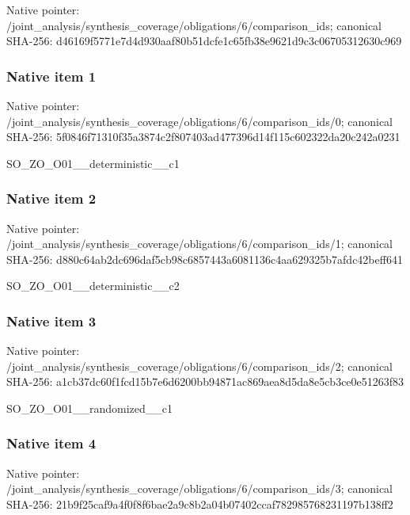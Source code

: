 \documentclass[10pt,a4paper]{article}
\begin{document}
Native pointer: /joint\_analysis/synthesi\allowbreak{}s\_coverage/obligations/6\allowbreak{}/comparison\_ids; canonical SHA-256: d46169f5771e7d4d930aaf80\allowbreak{}b51dcfe1c65fb38e9621d9c3\allowbreak{}c06705312630c969



\subsubsection{Native item 1}


Native pointer: /joint\_analysis/synthesi\allowbreak{}s\_coverage/obligations/6\allowbreak{}/comparison\_ids/0; canonical SHA-256: 5f0846f71310f35a3874c2f8\allowbreak{}07403ad477396d14f115c602\allowbreak{}322da20c242a0231


SO\_ZO\_O01\_\_deterministic\_\_c1


\subsubsection{Native item 2}


Native pointer: /joint\_analysis/synthesi\allowbreak{}s\_coverage/obligations/6\allowbreak{}/comparison\_ids/1; canonical SHA-256: d880c64ab2dc696daf5cb98c\allowbreak{}6857443a6081136c4aa62932\allowbreak{}5b7afdc42beff641


SO\_ZO\_O01\_\_deterministic\_\_c2


\subsubsection{Native item 3}


Native pointer: /joint\_analysis/synthesi\allowbreak{}s\_coverage/obligations/6\allowbreak{}/comparison\_ids/2; canonical SHA-256: a1cb37dc60f1fcd15b7e6d62\allowbreak{}00bb94871ac869aea8d5da8e\allowbreak{}5cb3ce0e51263f83


SO\_ZO\_O01\_\_randomized\_\_c1


\subsubsection{Native item 4}


Native pointer: /joint\_analysis/synthesi\allowbreak{}s\_coverage/obligations/6\allowbreak{}/comparison\_ids/3; canonical SHA-256: 21b9f25caf9a4f0f8f6bae2a\allowbreak{}9c8b2a04b07402ccaf782985\allowbreak{}768231197b138ff2
\end{document}
